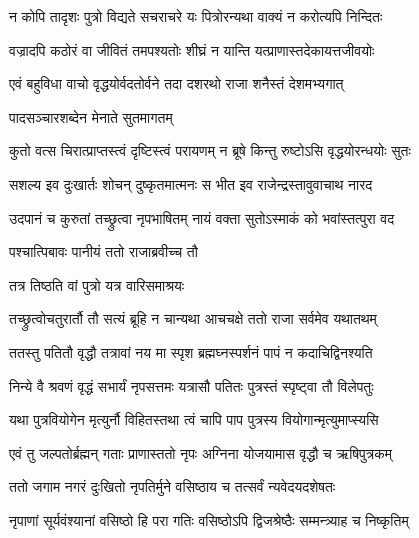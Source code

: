 \twolineshloka
{न कोपि तादृशः पुत्रो विद्यते सचराचरे}
{यः पित्रोरन्यथा वाक्यं न करोत्यपि निन्दितः} %

\twolineshloka
{वज्रादपि कठोरं वा जीवितं तमपश्यतोः}
{शीघ्रं न यान्ति यत्प्राणास्तदेकायत्तजीवयोः} %



\twolineshloka
{एवं बहुविधा वाचो वृद्धयोर्वदतोर्वने}
{तदा दशरथो राजा शनैस्तं देशमभ्यगात्} %

\onelineshloka
{पादसञ्चारशब्देन मेनाते सुतमागतम्}%



\twolineshloka
{कुतो वत्स चिरात्प्राप्तस्त्वं दृष्टिस्त्वं परायणम्}
{न ब्रूषे किन्तु रुष्टोऽसि वृद्धयोरन्धयोः सुतः} %



\twolineshloka
{सशल्य इव दुःखार्तः शोचन् दुष्कृतमात्मनः}
{स भीत इव राजेन्द्रस्तावुवाचाथ नारद} %

\twolineshloka
{उदपानं च कुरुतां तच्छ्रुत्वा नृपभाषितम्}
{नायं वक्ता सुतोऽस्माकं को भवांस्तत्पुरा वद} %

\onelineshloka
{पश्चात्पिबावः पानीयं ततो राजाब्रवीच्च तौ}%



\onelineshloka
{तत्र तिष्ठति वां पुत्रो यत्र वारिसमाश्रयः}%



\twolineshloka
{तच्छ्रुत्वोचतुरार्तौ तौ सत्यं ब्रूहि न चान्यथा}
{आचचक्षे ततो राजा सर्वमेव यथातथम्} %

\twolineshloka
{ततस्तु पतितौ वृद्धौ तत्रावां नय मा स्पृश}
{ब्रह्मघ्नस्पर्शनं पापं न कदाचिद्विनश्यति} %

\twolineshloka
{निन्ये वै श्रवणं वृद्धं सभार्यं नृपसत्तमः}
{यत्रासौ पतितः पुत्रस्तं स्पृष्ट्वा तौ विलेपतुः} %



\twolineshloka
{यथा पुत्रवियोगेन मृत्युर्नौ विहितस्तथा}
{त्वं चापि पाप पुत्रस्य वियोगान्मृत्युमाप्स्यसि} %



\twolineshloka
{एवं तु जल्पतोर्ब्रह्मन् गताः प्राणास्ततो नृपः}
{अग्निना योजयामास वृद्धौ च ऋषिपुत्रकम्} %

\twolineshloka
{ततो जगाम नगरं दुःखितो नृपतिर्मुने}
{वसिष्ठाय च तत्सर्वं न्यवेदयदशेषतः} %

\twolineshloka
{नृपाणां सूर्यवंश्यानां वसिष्ठो हि परा गतिः}
{वसिष्ठोऽपि द्विजश्रेष्ठैः सम्मन्त्र्याह च निष्कृतिम्} %

